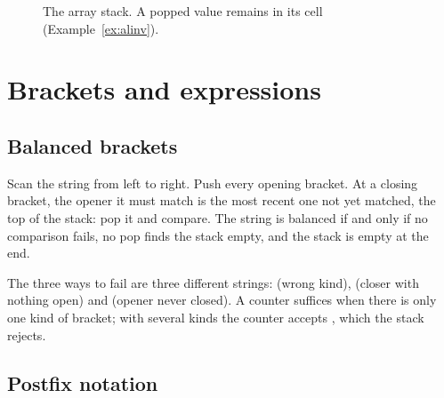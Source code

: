 \begin{figure}[ht]\centering
{}
\caption{The array stack. A popped value remains in its cell (Example~\ref{ex:alinv}).}
\end{figure}

\section{Brackets and expressions}

\subsection{Balanced brackets}

Scan the string from left to right. Push every opening bracket. At a closing bracket,
the opener it must match is the most recent one not yet matched, the top of the stack:
pop it and compare. The string is balanced if and only if no comparison fails, no pop
finds the stack empty, and the stack is empty at the end.


The three ways to fail are three different strings: \cc{"(]"} (wrong kind),
 (closer with nothing open) and  (opener never closed). A counter
suffices when there is only one kind of bracket; with several kinds the counter accepts
, which the stack rejects.

\subsection{Postfix notation}

